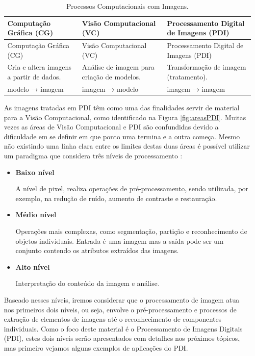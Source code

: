 \documentclass[
  brazilian,
]{book}
\begin{document}
\begin{longtable}[]{@{}
  >{\centering\arraybackslash}p{}
  >{\centering\arraybackslash}p{}
  >{\centering\arraybackslash}p{}@{}}
\caption{\label{tab:processos} Processos Computacionais com Imagens.}\tabularnewline
\toprule
Computação Gráfica (CG) & Visão Computacional (VC) & Processamento Digital de Imagens (PDI) \\
\midrule
\endfirsthead
\toprule
Computação Gráfica (CG) & Visão Computacional (VC) & Processamento Digital de Imagens (PDI) \\
\midrule
\endhead
Cria e altera imagens a partir de dados. & Análise de imagem para criação de modelos. & Transformação de imagem (tratamento). \\
modelo → imagem & imagem → modelo & imagem → imagem \\
\bottomrule
\end{longtable}

As imagens tratadas em PDI têm como uma das finalidades servir de material para a Visão Computacional, como identificado na Figura \ref{fig:areasPDI}. Muitas vezes as áreas de Visão Computacional e PDI são confundidas devido a dificuldade em se definir em que ponto uma termina e a outra começa. Mesmo não existindo uma linha clara entre os limites destas duas áreas é possível utilizar um paradigma que considera três níveis de processamento \autocite[p.~2]{gonzalez2010}:

\begin{itemize}
\item
  \textbf{Baixo nível}

  A nível de pixel, realiza operações de pré-processamento, sendo utilizada, por exemplo, na redução de ruído, aumento de contraste e restauração.
\item
  \textbf{Médio nível}

  Operações mais complexas, como segmentação, partição e reconhecimento de objetos individuais. Entrada é uma imagem mas a saída pode ser um conjunto contendo os atributos extraídos das imagens.
\item
  \textbf{Alto nível}

  Interpretação do conteúdo da imagem e análise.
\end{itemize}

Baseado nesses níveis, iremos considerar que o processamento de imagem atua nos primeiros dois níveis, ou seja, envolve o pré-processamento e processos de extração de elementos de imagens até o reconhecimento de componentes individuais. Como o foco deste material é o Processamento de Imagens Digitais (PDI), estes dois níveis serão apresentados com detalhes nos próximos tópicos, mas primeiro vejamos alguns exemplos de aplicações do PDI.
\end{document}
